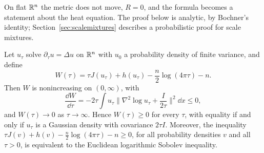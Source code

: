On flat $\mathbb{R}^n$ the metric does not move, $R=0$, and the formula becomes a statement about the heat equation. The proof below is analytic, by Bochner's identity; Section~\ref{sec:scalemixtures} describes a probabilistic proof for scale mixtures.

\begin{theorem}
\label{thm:perelman_flat}
Let $u_\tau$ solve $\partial_\tau u = \Delta u$ on $\mathbb{R}^n$ with $u_0$ a probability density of finite variance, and define
\[
W(\tau) = \tau J(u_\tau)+h(u_\tau)-\frac n2\log(4\pi\tau)-n.
\]
Then $W$ is nonincreasing on $(0,\infty)$, with
\[
\frac{\dd W}{\dd\tau} = -2\tau\int u_\tau\Big\|\nabla^2\log u_\tau+\frac{I}{2\tau}\Big\|^2\dd x\leq0,
\]
and $W(\tau)\to0$ as $\tau\to\infty$. Hence $W(\tau)\geq0$ for every $\tau$, with equality if and only if $u_\tau$ is a Gaussian density with covariance $2\tau I$. Moreover, the inequality $\tau J(v)+h(v)-\frac n2\log(4\pi\tau)-n\geq0$, for all probability densities $v$ and all $\tau>0$, is equivalent to the Euclidean logarithmic Sobolev inequality.
\end{theorem}

